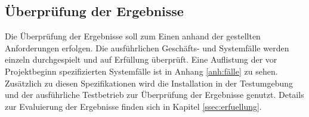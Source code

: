 \subsection{Überprüfung der Ergebnisse}
Die Überprüfung der Ergebnisse soll zum Einen anhand der gestellten Anforderungen erfolgen. Die ausführlichen Geschäfts- und Systemfälle werden einzeln durchgespielt und auf Erfüllung überprüft. Eine Auflistung der vor Projektbeginn spezifizierten Systemfälle ist in Anhang \ref{anh:fälle} zu sehen. Zusätzlich zu diesen Spezifikationen wird die Installation in der Testumgebung und der ausführliche Testbetrieb zur Überprüfung der Ergebnisse genutzt. Details zur Evaluierung der Ergebnisse finden sich in Kapitel \ref{ssec:erfuellung}.









